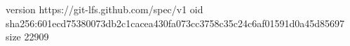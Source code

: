 version https://git-lfs.github.com/spec/v1
oid sha256:601ecd75380073db2c1cacea430fa073cc3758c35c24c6af01591d0a45d85697
size 22909
